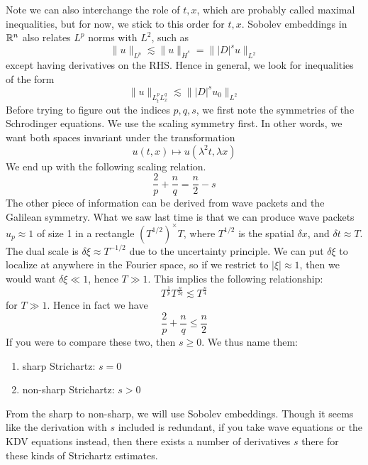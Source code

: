 Note we can also interchange the role of $t,x$, which are probably called maximal inequalities, but for now, we stick to this order for $t,x$. Sobolev embeddings in $\mathbb{R}^n$ also relates $L^p$ norms with $L^2$, such as
\begin{equation*}
    \|u\|_{L^p}\lesssim \|u\|_{\dot{H}^s}=\||D|^su\|_{L^2}
\end{equation*}
except having derivatives on the RHS. Hence in general, we look for inequalities of the form
\begin{equation*}
    \|u\|_{L_t^pL_x^q}\lesssim \||D|^su_0\|_{L^2}
\end{equation*}
Before trying to figure out the indices $p,q,s$, we first note the symmetries of the Schrodinger equations. We use the scaling symmetry first. In other words, we want both spaces invariant under the transformation
\begin{equation*}
    u(t,x)\mapsto u(\lambda^2t, \lambda x)
\end{equation*}
We end up with the following scaling relation.
\begin{equation*}
    \frac{2}{p}+\frac{n}{q}=\frac{n}{2}-s
\end{equation*}
The other piece of information can be derived from wave packets and the Galilean symmetry. What we saw last time is that we can produce wave packets $u_p\approx 1$ of size 1 in a rectangle $(T^{1/2})^\times T$, where $T^{1/2}$ is the spatial $\delta x$, and $\delta t\approx T$. The dual scale is $\delta\xi\approx T^{-1/2}$ due to the uncertainty principle. We can put $\delta\xi$ to localize at anywhere in the Fourier space, so if we restrict to $|\xi|\approx 1$, then we would want $\delta\xi\ll 1$, hence $T\gg 1$. This implies the following relationship:
\begin{equation*}
    T^{\frac{1}{p}}T^{\frac{n}{2q}}\lesssim T^\frac{n}{4}
\end{equation*}
for $T\gg 1$. Hence in fact we have
\begin{equation*}
    \frac{2}{p}+\frac{n}{q}\leq\frac{n}{2}
\end{equation*}
If you were to compare these two, then $s\geq 0$. We thus name them:
\begin{enumerate}
    \item sharp Strichartz: $s=0$
    \item non-sharp Strichartz: $s>0$
\end{enumerate}
From the sharp to non-sharp, we will use Sobolev embeddings. Though it seems like the derivation with $s$ included is redundant, if you take wave equations or the KDV equations instead, then there exists a number of derivatives $s$ there for these kinds of Strichartz estimates.

